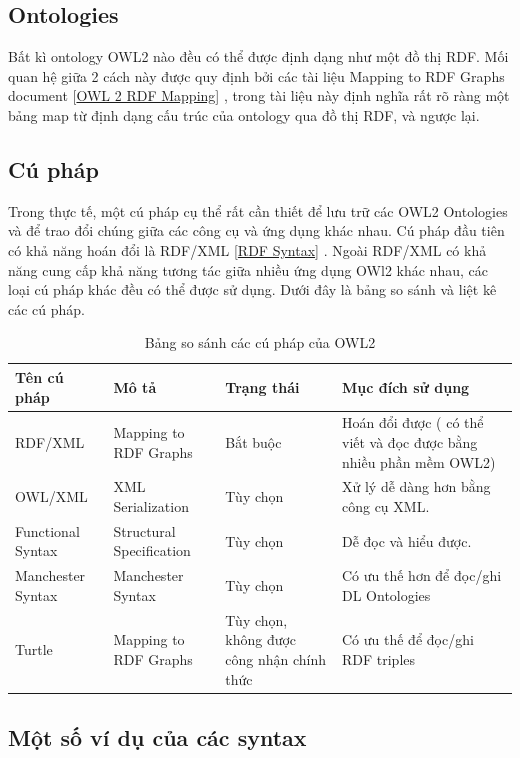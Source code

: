 \subsection{Ontologies}
Bất kì ontology OWL2 nào đều có thể được định dạng như một đồ thị RDF. Mối quan hệ giữa 2 cách này được quy định bởi các tài liệu Mapping to RDF Graphs document [\href{http://www.w3.org/TR/owl2-overview/#ref-owl-2-rdf-mapping}{OWL 2 RDF Mapping}] \cite{mapping_rdf_graph}, trong tài liệu này định nghĩa rất rõ ràng một bảng map từ định dạng cấu trúc của ontology qua đồ thị RDF, và ngược lại. 
\subsection{Cú pháp}
Trong thực tế, một cú pháp cụ thể rất cần thiết để lưu trữ các OWL2 Ontologies và để trao đổi chúng giữa các công cụ và ứng dụng khác nhau. Cú pháp đầu tiên có khả năng hoán đổi là RDF/XML [\href{http://www.w3.org/TR/owl2-overview/#ref-rdf-syntax}{RDF Syntax}] \cite{rdfxml}. Ngoài RDF/XML có khả năng cung cấp khả năng tương tác giữa nhiều ứng dụng OWl2 khác nhau, các loại cú pháp khác đều có thể được sử dụng. Dưới đây là bảng so sánh và liệt kê các cú pháp.


\begin{table}[H]
\begin{tabular}{ |p{3cm}|p{4cm}|p{2cm}|p{4cm}|}
\hline
Tên cú pháp & Mô tả & Trạng thái & Mục đích sử dụng\\
\hline
RDF/XML & Mapping to RDF Graphs \cite{mapping_rdf_graph} \cite{rdfxml} & Bắt buộc & Hoán đổi được ( có thể viết và đọc được bằng nhiều phần mềm OWL2)
\\
\hline
OWL/XML & XML Serialization \cite{owlxml} & Tùy chọn & Xử lý dễ dàng hơn bằng công cụ XML.
\\
\hline
Functional Syntax & Structural Specification \cite{func_syntax} & Tùy chọn & Dễ đọc và hiểu được.
\\
\hline
Manchester Syntax & Manchester Syntax \cite{man_syntax} & Tùy chọn & Có ưu thế hơn để đọc/ghi DL Ontologies
\\
\hline
Turtle & Mapping to RDF Graphs \cite{mapping_rdf_graph} & Tùy chọn, không được công nhận chính thức & Có ưu thế để đọc/ghi RDF triples
\\
\hline
\end{tabular}
\caption{Bảng so sánh các cú pháp của OWL2\label{overflow}}
\end{table}
\subsection{Một số ví dụ của các syntax}

